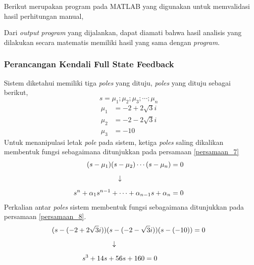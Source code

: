 \documentclass[../main.tex]{subfiles}
\begin{document}
                Berikut merupakan program pada MATLAB yang digunakan untuk memvalidasi hasil perhitungan manual,
                
                Dari \textit{output} \textit{program} yang dijalankan, dapat diamati bahwa hasil analisis yang dilakukan secara matematis memiliki hasil yang sama dengan \textit{program}.
                
            \subsubsection{Perancangan Kendali Full State Feedback}
                Sistem diketahui memiliki tiga \textit{poles} yang dituju, \textit{poles} yang dituju sebagai berikut,
                \begin{equation}
                    s = \mu_1;\mu_2;\mu_3;\cdots;\mu_n
                \end{equation}
                \begin{equation}
                    \begin{split}
                        \mu_1 &= -2 + 2\sqrt{3}i \\[5pt]
                        \mu_2 &= -2 - 2\sqrt{3}i \\[5pt]
                        \mu_3 &= -10
                    \end{split}
                \end{equation}
                Untuk menanipulasi letak \textit{pole} pada sistem, ketiga \textit{poles} saling dikalikan membentuk fungsi sebagaimana ditunjukkan pada persamaan \eqref{persamaan_7}
                \begin{equation}
                    \begin{split}
                        (s-\mu_1)(s-\mu_2)\cdots(s-\mu_n) &= 0\\[5pt]
                        \downarrow \hspace{2.5cm}&\\[5pt]
                        s^n + \alpha_1s^{n-1}+\cdots+\alpha_{n-1}s+\alpha_n &= 0
                        \label{persamaan_7}
                    \end{split}
                \end{equation}
                Perkalian antar \textit{poles} sistem membentuk fungsi sebagaimana ditunjukkan pada persamaan \eqref{persamaan_8}.
                \begin{equation}
                    \begin{split}
                        (s-(-2+2\sqrt{3}i))(s-(-2-\sqrt{3}i))(s-(-10)) &= 0\\[5pt]
                        \downarrow \hspace{3.9cm}&\\[5pt]
                        s^3 + 14s + 56s + 160 =0 \hspace{1.8cm}&\\[5pt]
                        \label{persamaan_8}
                    \end{split}
                \end{equation}
\end{document}
